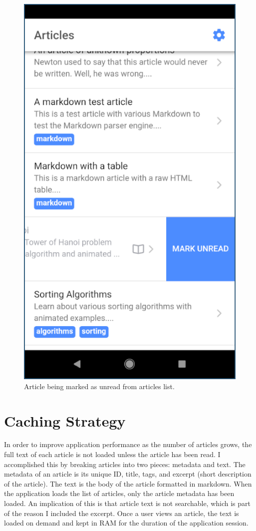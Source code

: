 \documentclass[12pt]{report}
\begin{document}
\begin{figure}
    \centering
    \includegraphics[scale=0.5]{images/avd-article-mark-unread.png}
    \caption{Article being marked as unread from articles list.}
    \label{fig:avd-article-mark-unread}
\end{figure}

    \section{Caching Strategy}

In order to improve application performance as the number of articles grows, the
full text of each article is not loaded unless the article has been read. I
accomplished this by breaking articles into two pieces: metadata and text. The
metadata of an article is its unique ID, title, tags, and excerpt (short
description of the article). The text is the body of the article formatted in
markdown. When the application loads the list of articles, only the article
metadata has been loaded. An implication of this is that article text is not
searchable, which is part of the reason I included the excerpt. Once a user
views an article, the text is loaded on demand and kept in RAM for the duration
of the application session.
\end{document}
